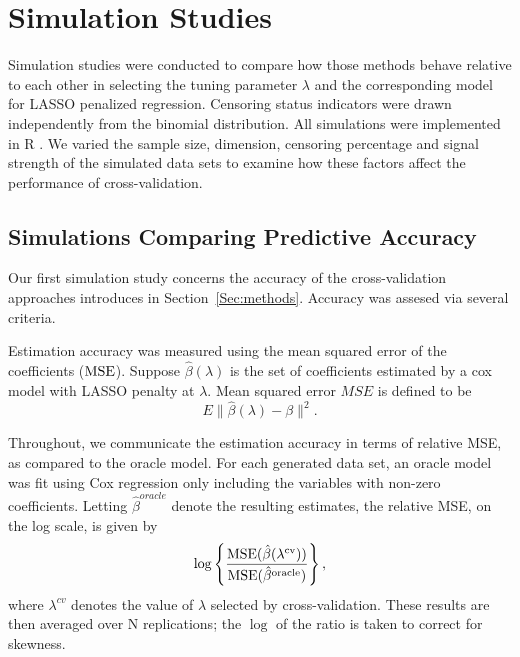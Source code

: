 \section{Simulation Studies}

Simulation studies were conducted to compare how those methods behave relative to each other in selecting the tuning parameter $\lambda$ and the corresponding model for LASSO penalized regression.  Censoring status indicators were drawn independently from the binomial distribution. All simulations were implemented in R \citep{R}. We varied the sample size, dimension, censoring percentage and signal strength of the simulated data sets to examine how these factors affect the performance of cross-validation.
   
\subsection {Simulations Comparing Predictive Accuracy}
\label{Sec:accuracy}

Our first simulation study concerns the accuracy of the cross-validation approaches introduces in Section~\ref{Sec:methods}.  Accuracy was assesed via several criteria.

Estimation accuracy was measured using the mean squared error of the coefficients ($\textrm{MSE}$). Suppose $\hat{\beta}(\lambda)$ is the set of coefficients estimated by a cox model with LASSO penalty at $\lambda$. Mean squared error $MSE$ is defined to be 
\begin{equation}
E\| \hat{\beta}(\lambda) - \beta \| ^2.
\end{equation}

Throughout, we communicate the estimation accuracy in terms of relative MSE, as compared to the oracle model.  For each generated data set, an oracle model was fit using Cox regression only including the variables with non-zero coefficients. Letting $\hat{\beta}^{oracle}$ denote the resulting estimates, the relative MSE, on the log scale, is given by
\begin{equation}
\log\left\{ \frac{\textrm{MSE}(\hat{\beta}(\lambda^{\text{cv}}))}{\textrm{MSE}(\hat{\beta}^{\text{oracle}})} \right\},
\end{equation}
where $\lambda^{cv}$ denotes the value of $\lambda$ selected by cross-validation.   These results are then averaged over N replications; the $\log$ of the ratio is taken to correct for skewness. 

